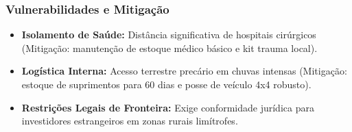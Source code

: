 \subsubsection{Vulnerabilidades e
Mitigação}

\begin{itemize}
\tightlist
\item
  \textbf{Isolamento de Saúde:} Distância significativa de hospitais
  cirúrgicos (Mitigação: manutenção de estoque médico básico e kit
  trauma local).
\item
  \textbf{Logística Interna:} Acesso terrestre precário em chuvas
  intensas (Mitigação: estoque de suprimentos para 60 dias e posse de
  veículo 4x4 robusto).
\item
  \textbf{Restrições Legais de Fronteira:} Exige conformidade jurídica
  para investidores estrangeiros em zonas rurais
  limítrofes.
\end{itemize}

